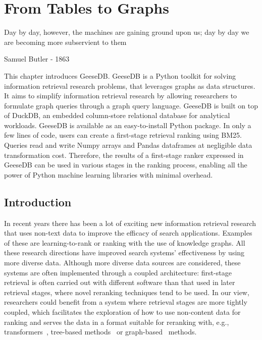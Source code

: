 \chapter{From Tables to Graphs}
\label{from-tables-to-graphs}
\epigraph{Day by day, however, the machines are gaining ground upon us; day by day we are becoming more subservient to them}{Samuel Butler - 1863}

\begin{Abstract}
	\begin{changemargin}{1cm}{1cm}
		This chapter introduces GeeseDB. GeeseDB is a Python toolkit for solving information retrieval research problems, that leverages graphs as data structures. It aims to simplify information retrieval research by allowing researchers to formulate graph queries through a graph query language. GeeseDB is built on top of DuckDB, an embedded column-store relational database for analytical workloads. GeeseDB is available as an easy-to-install Python package. In only a few lines of code, users can create a first-stage retrieval ranking using BM25. Queries read and write Numpy arrays and Pandas dataframes at negligible data transformation cost. Therefore, the results of a first-stage ranker expressed in GeeseDB can be used in various stages in the ranking process, enabling all the power of Python machine learning libraries with minimal overhead.
	\end{changemargin}
\end{Abstract}

\section{Introduction}
In recent years there has been a lot of exciting new information retrieval research that uses non-text data to improve the efficacy of search applications. Examples of these are learning-to-rank or ranking with the use of knowledge graphs. All these research directions have improved search systems' effectiveness by using more diverse data. Although more diverse data sources are considered, these systems are often implemented through a coupled architecture: first-stage retrieval is often carried out with different software than that used in later retrieval stages, where novel reranking techniques tend to be used. In our view, researchers could benefit from a system where retrieval stages are more tightly coupled, which facilitates the exploration of how to use non-content data for ranking and serves the data in a format suitable for reranking with, e.g., transformers~\citep{dense-retrieval-1, dense-retrieval-2, dense-retrieval-3}, tree-based methods~\citep{lambdamart} or graph-based~\citep{pagerank,entity-1,entity-2,entity-3} methods.

